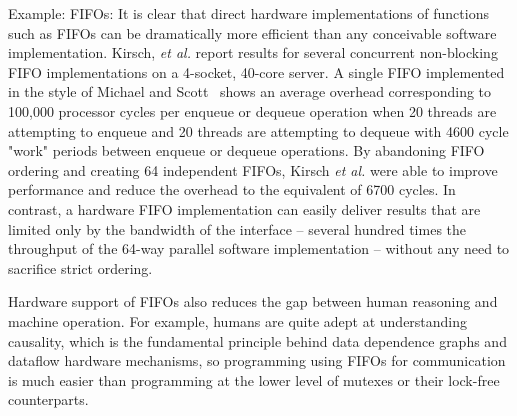      Example: FIFOs: It is clear that direct hardware implementations
     of functions such as FIFOs can be dramatically more efficient
     than any conceivable software implementation.  Kirsch, \textit{et
       al.} report results for several concurrent non-blocking FIFO
     implementations on a 4-socket, 40-core server.  A single FIFO
     implemented in the style of Michael and
     Scott~\cite{michael1996simple} shows an average overhead
     corresponding to 100,000 processor cycles per enqueue or dequeue
     operation when 20 threads are attempting to enqueue and 20
     threads are attempting to dequeue with 4600 cycle "work" periods
     between enqueue or dequeue operations.  By abandoning FIFO
     ordering and creating 64 independent FIFOs, Kirsch \textit{et
       al.} were able to improve performance and reduce the overhead
     to the equivalent of 6700 cycles.  In contrast, a hardware FIFO
     implementation can easily deliver results that are limited only
     by the bandwidth of the interface -- several hundred times the
     throughput of the 64-way parallel software implementation --
     without any need to sacrifice strict ordering.
     
     Hardware support of FIFOs also reduces the gap between human
     reasoning and machine operation.  For example, humans are quite
     adept at understanding causality, which is the fundamental
     principle behind data dependence graphs and dataflow hardware
     mechanisms, so programming using FIFOs for communication is much
     easier than programming at the lower level of mutexes or their
     lock-free counterparts.

